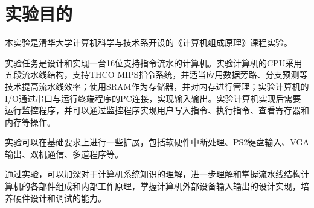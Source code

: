 
\chapter{实验目的} %

\label{Chapter1} %


\newcommand{\keyword}[1]{\textbf{#1}}
\newcommand{\tabhead}[1]{\textbf{#1}}
\newcommand{\code}[1]{\texttt{#1}}
\newcommand{\file}[1]{\texttt{\bfseries#1}}
\newcommand{\option}[1]{\texttt{\itshape#1}}

本实验是清华大学计算机科学与技术系开设的《计算机组成原理》课程实验。

实验任务是设计和实现一台16位支持指令流水的计算机。实验计算机的CPU采用五段流水线结构，支持THCO MIPS指令系统，并适当应用数据旁路、分支预测等技术提高流水线效率；使用SRAM作为存储器，并对内存进行管理；实验计算机的I/O通过串口与运行终端程序的PC连接，实现输入输出。实验计算机实现后需要运行监控程序，并可以通过监控程序实现用户写入指令、执行指令、查看寄存器和内存等操作。

实验可以在基础要求上进行一些扩展，包括软硬件中断处理、PS2键盘输入、VGA输出、双机通信、多道程序等。

通过实验，可以加深对于计算机系统知识的理解，进一步理解和掌握流水线结构计算机的各部件组成和内部工作原理，掌握计算机外部设备输入输出的设计实现，培养硬件设计和调试的能力。



